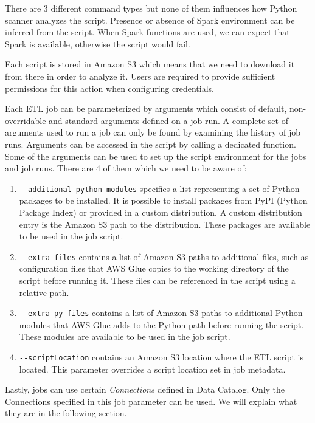 There are 3 different command types but none of them influences how Python scanner analyzes the script. Presence or absence of Spark environment can be inferred from the script. When Spark functions are used, we can expect that Spark is available, otherwise the script would fail.
\par
Each script is stored in Amazon S3 which means that we need to download it from there in order to analyze it. Users are required to provide sufficient permissions for this action when configuring credentials.
\par
Each ETL job can be parameterized by arguments which consist of default, non-overridable and standard arguments defined on a job run. A complete set of arguments used to run a job can only be found by examining the history of job runs. Arguments can be accessed in the script by calling a dedicated function. Some of the arguments can be used to set up the script environment for the jobs and job runs. There are 4 of them which we need to be aware of:
\begin{enumerate}
    \item \texttt{-{}-additional-python-modules} specifies a list representing a set of Python packages to be installed. It is possible to install packages from PyPI (Python Package Index) or provided in a custom distribution. A custom distribution entry is the Amazon S3 path to the distribution. These packages are available to be used in the job script.
    \item \texttt{-{}-extra-files} contains a list of Amazon S3 paths to additional files, such as configuration files that AWS Glue copies to the working directory of the script before running it. These files can be referenced in the script using a relative path.
    \item \texttt{-{}-extra-py-files} contains a list of Amazon S3 paths to additional Python modules that AWS Glue adds to the Python path before running the script. These modules are available to be used in the job script.
    \item \texttt{-{}-scriptLocation} contains an Amazon S3 location where the ETL script is located. This parameter overrides a script location set in job metadata.
\end{enumerate}
Lastly, jobs can use certain \textit{Connections} defined in Data Catalog. Only the Connections specified in this job parameter can be used. We will explain what they are in the following section.

